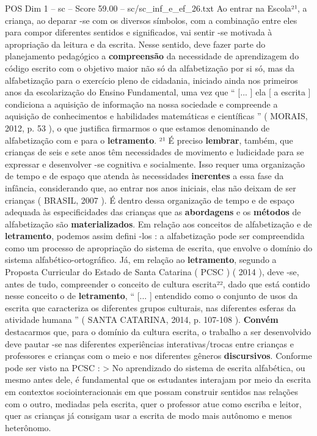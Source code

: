 \begin{textsample}{POS Dim 1 – sc – Score 59.00 – sc/sc\_inf\_e\_ef\_26.txt}
Ao entrar na Escola²¹, a criança, ao deparar -se com os diversos símbolos, com a combinação entre eles para compor diferentes sentidos e significados, vai sentir -se motivada à apropriação da leitura e da escrita.
Nesse sentido, deve fazer parte do planejamento pedagógico a \textbf{compreensão} da necessidade de aprendizagem do código escrito com o objetivo maior não só da alfabetização por si só, mas da alfabetização para o exercício pleno de cidadania, iniciado ainda nos primeiros anos da escolarização do Ensino Fundamental, uma vez que “ [... ] ela [ a escrita ] condiciona a aquisição de informação na nossa sociedade e compreende a aquisição de conhecimentos e habilidades matemáticas e científicas ” ( MORAIS, 2012, p. 53 ), o que justifica firmarmos o que estamos denominando de alfabetização com e para o \textbf{letramento}. ²¹ É preciso \textbf{lembrar}, também, que crianças de seis e sete anos têm necessidades de movimento e ludicidade para se expressar e desenvolver -se cognitiva e socialmente.
Isso requer uma organização de tempo e de espaço que atenda às necessidades \textbf{inerentes} a essa fase da infância, considerando que, ao entrar nos anos iniciais, elas não deixam de ser crianças ( BRASIL, 2007 ).
É dentro dessa organização de tempo e de espaço adequada às especificidades das crianças que as \textbf{abordagens} e os \textbf{métodos} de alfabetização são \textbf{materializados}.
Em relação aos conceitos de alfabetização e de \textbf{letramento}, podemos assim defini -los : a alfabetização pode ser compreendida como um processo de apropriação do sistema de escrita, que envolve o domínio do sistema alfabético-ortográfico.
Já, em relação ao \textbf{letramento}, segundo a Proposta Curricular do Estado de Santa Catarina ( PCSC ) ( 2014 ), deve -se, antes de tudo, compreender o conceito de cultura escrita²², dado que está contido nesse conceito o de \textbf{letramento}, “ [... ] entendido como o conjunto de usos da escrita que caracteriza os diferentes grupos culturais, nas diferentes esferas da atividade humana ” ( SANTA CATARINA, 2014, p. 107-108 ). \textbf{Convém} destacarmos que, para o domínio da cultura escrita, o trabalho a ser desenvolvido deve pautar -se nas diferentes experiências interativas/trocas entre crianças e professores e crianças com o meio e nos diferentes gêneros \textbf{discursivos}.
Conforme pode ser visto na PCSC : > No aprendizado do sistema de escrita alfabética, ou mesmo antes dele, é fundamental que os estudantes interajam por meio da escrita em contextos sociointeracionais em que possam construir sentidos nas relações com o outro, mediadas pela escrita, quer o professor atue como escriba e leitor, quer as crianças já consigam usar a escrita de modo mais autônomo e menos heterônomo.

\end{textsample}
